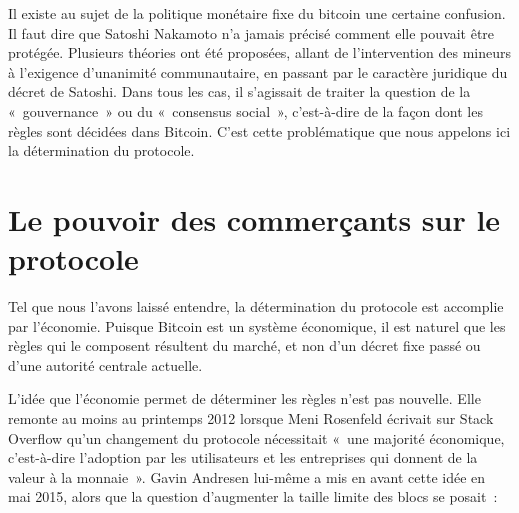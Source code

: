 Il existe au sujet de la politique monétaire fixe du bitcoin une certaine confusion. Il faut dire que Satoshi Nakamoto n'a jamais précisé comment elle pouvait être protégée. Plusieurs théories ont été proposées, allant de l'intervention des mineurs à l'exigence d'unanimité communautaire, en passant par le caractère juridique du décret de Satoshi. Dans tous les cas, il s'agissait de traiter la question de la «~gouvernance~» ou du «~consensus social~», c'est-à-dire de la façon dont les règles sont décidées dans Bitcoin. C'est cette problématique que nous appelons ici la détermination du protocole.

\vspace{-1em}
\section*{Le pouvoir des commerçants sur le protocole}

Tel que nous l'avons laissé entendre, la détermination du protocole est accomplie par l'économie. Puisque Bitcoin est un système économique, il est naturel que les règles qui le composent résultent du marché, et non d'un décret fixe passé ou d'une autorité centrale actuelle.

L'idée que l'économie permet de déterminer les règles n'est pas nouvelle. Elle remonte au moins au printemps 2012 lorsque Meni Rosenfeld écrivait sur Stack Overflow qu'un changement du protocole nécessitait «~une majorité économique, c'est-à-dire l'adoption par les utilisateurs et les entreprises qui donnent de la valeur à la monnaie~». Gavin Andresen lui-même a mis en avant cette idée en mai 2015, alors que la question d'augmenter la taille limite des blocs se posait~: %

